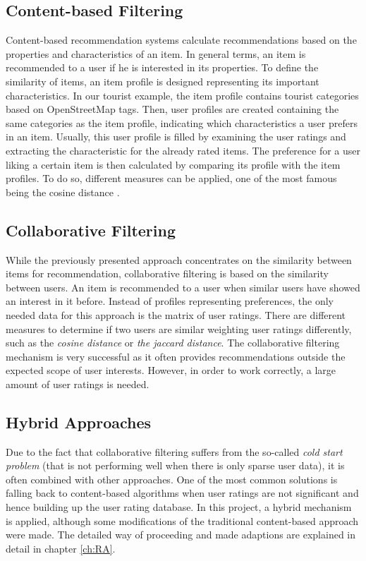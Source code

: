 \subsection{Content-based Filtering}
Content-based recommendation systems calculate recommendations based on the properties and characteristics of an item. In general terms, an item is recommended to a user if he is interested in its properties.  To define the similarity of items, an item profile is designed representing its important characteristics. In our tourist example, the item profile contains tourist categories based on OpenStreetMap tags. Then, user profiles are created containing the same categories as the item profile, indicating which characteristics a user prefers in an item. Usually, this user profile is filled by examining the user ratings and extracting the characteristic for the already rated items.
The preference for a user liking a certain item is then calculated by comparing its profile with the item profiles. To do so, different measures can be applied, one of the most famous being the cosine distance \cite{rajaraman16}. 
 
\subsection{Collaborative Filtering}
While the previously presented approach concentrates on the similarity between items for recommendation, collaborative filtering is based on the similarity between users. An item is recommended to a user when similar users have showed an interest in it before. Instead of profiles representing preferences, the only needed data for this approach is the matrix of user ratings. There are different measures to determine if two users are similar weighting user ratings differently, such as the \textit{cosine distance} or \textit{the jaccard distance}. The collaborative filtering mechanism is very successful as it often provides recommendations outside the expected scope of user interests. However, in order to work correctly, a large amount of user ratings is needed.

\subsection{Hybrid Approaches}
Due to the fact that collaborative filtering suffers from the so-called \textit{cold start problem} (that is not performing well when there is only sparse user data), it is often combined with other approaches. One of the most common solutions is falling back to content-based algorithms when user ratings are not significant and hence building up the user rating database. In this project, a hybrid mechanism is applied, although some modifications of the traditional content-based approach were made. The detailed way of proceeding and made adaptions are explained in detail in chapter \ref{ch:RA}.

